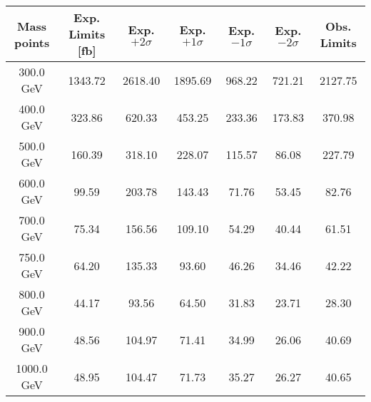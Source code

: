 
\begin{table}
\begin{center}
\begin{tabular}{c|cccccc}
\hline
\hline
Mass points & Exp. Limits [fb] & Exp. $+2\sigma$ & Exp. $+1\sigma$ &  Exp. $-1\sigma$  &  Exp. $-2\sigma$ & Obs. Limits \\
\hline
300.0 GeV  &  1343.72  & 2618.40  & 1895.69  & 968.22  & 721.21   & 2127.75\\
400.0 GeV  &  323.86  & 620.33  & 453.25  & 233.36  & 173.83   & 370.98\\
500.0 GeV  &  160.39  & 318.10  & 228.07  & 115.57  & 86.08   & 227.79\\
600.0 GeV  &  99.59  & 203.78  & 143.43  & 71.76  & 53.45   & 82.76\\
700.0 GeV  &  75.34  & 156.56  & 109.10  & 54.29  & 40.44   & 61.51\\
750.0 GeV  &  64.20  & 135.33  & 93.60  & 46.26  & 34.46   & 42.22\\
800.0 GeV  &  44.17  & 93.56  & 64.50  & 31.83  & 23.71   & 28.30\\
900.0 GeV  &  48.56  & 104.97  & 71.41  & 34.99  & 26.06   & 40.69\\
1000.0 GeV  &  48.95  & 104.47  & 71.73  & 35.27  & 26.27   & 40.65\\

\hline
\hline
\end{tabular}
\end{center}
\end{table}
